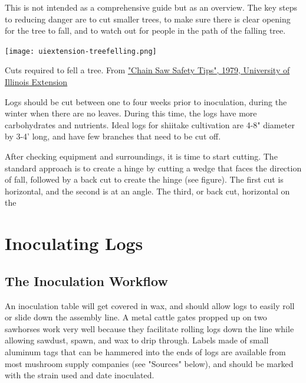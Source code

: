 \documentclass{tufte-handout}
\begin{document}
This is not intended as a comprehensive guide but as an overview.
The key steps to reducing danger are to cut smaller trees, to make sure there is clear opening for the tree to fall, and to watch out for people in the path of the falling tree.


\begin{marginfigure}
\texttt{[image: uiextension-treefelling.png]}
\caption{Cuts required to fell a tree. From \href{http://www.aces.uiuc.edu/vista/html_pubs/saw/saw.html}{"Chain Saw Safety Tips", 1979, University of Illinois Extension}}
\end{marginfigure}


Logs should be cut between one to four weeks prior to inoculation, during the winter when there are no leaves. 
During this time, the logs have more carbohydrates and nutrients. 
Ideal logs for shiitake cultivation are 4-8" diameter by 3-4' long, and have few branches that need to be cut off.

After checking equipment and surroundings, it is time to start cutting.
The standard approach is to create a hinge by cutting a wedge that faces the direction of fall, followed by a back cut to create the hinge (see figure). The first cut is horizontal, and the second is at an angle. The third, or back cut, horizontal on the 

\section{Inoculating Logs}



\subsection{The Inoculation Workflow}

An inoculation table will get covered in wax, and should allow logs to easily roll or slide down the assembly line. 
A metal cattle gates propped up on two
sawhorses work very well because they
facilitate rolling logs down the line while
allowing sawdust, spawn, and wax to drip
through. 
Labels made of small aluminum tags that can be hammered into the ends of logs are available from most mushroom supply companies (see "Sources" below), and should be marked with the strain used and date inoculated.
\end{document}
